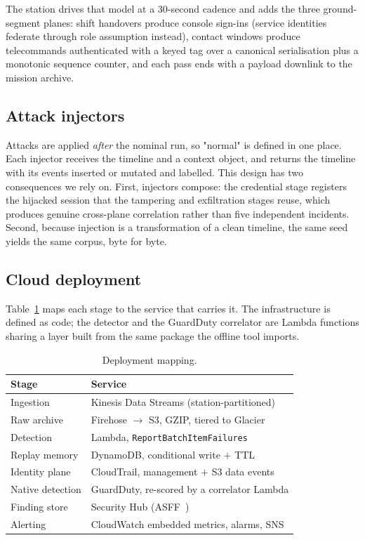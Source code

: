 \documentclass[conference]{IEEEtran}
\begin{document}
The station drives that model at a 30-second cadence and adds the three
ground-segment planes: shift handovers produce console sign-ins (service
identities federate through role assumption instead), contact windows produce
telecommands authenticated with a keyed tag over a canonical serialisation plus
a monotonic sequence counter, and each pass ends with a payload downlink to the
mission archive.

\subsection{Attack injectors}

Attacks are applied \emph{after} the nominal run, so "normal" is defined in one
place. Each injector receives the timeline and a context object, and returns the
timeline with its events inserted or mutated and labelled. This design has two
consequences we rely on. First, injectors compose: the credential stage
registers the hijacked session that the tampering and exfiltration stages
reuse, which produces genuine cross-plane correlation rather than five
independent incidents. Second, because injection is a transformation of a clean
timeline, the same seed yields the same corpus, byte for byte.

\subsection{Cloud deployment}

Table~\ref{tab:aws} maps each stage to the service that carries it. The
infrastructure is defined as code; the detector and the GuardDuty correlator
are Lambda functions sharing a layer built from the same package the offline
tool imports.

\begin{table}[t]
\caption{Deployment mapping.}
\label{tab:aws}
\centering
\begin{tabular}{@{}ll@{}}
\toprule
\textbf{Stage} & \textbf{Service} \\
\midrule
Ingestion & Kinesis Data Streams (station-partitioned) \\
Raw archive & Firehose $\rightarrow$ S3, GZIP, tiered to Glacier \\
Detection & Lambda, \texttt{ReportBatchItemFailures} \\
Replay memory & DynamoDB, conditional write $+$ TTL \\
Identity plane & CloudTrail, management $+$ S3 data events \\
Native detection & GuardDuty, re-scored by a correlator Lambda \\
Finding store & Security Hub (ASFF~\cite{asff}) \\
Alerting & CloudWatch embedded metrics, alarms, SNS \\
\bottomrule
\end{tabular}
\end{table}
\end{document}
